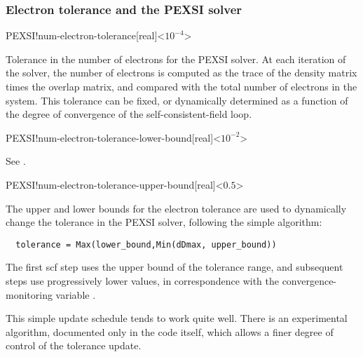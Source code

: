 \subsubsection{Electron tolerance and the PEXSI solver}


\begin{fdfentry}{PEXSI!num-electron-tolerance}[real]<$10^{-4}$>

  Tolerance in the number of electrons for the PEXSI solver. At each
  iteration of the solver, the number of electrons is computed as the
  trace of the density matrix times the overlap matrix, and compared
  with the total number of electrons in the system. This tolerance can
  be fixed, or dynamically determined as a function of the degree of
  convergence of the self-consistent-field loop.
  
\end{fdfentry}

\begin{fdfentry}{PEXSI!num-electron-tolerance-lower-bound}[real]<$10^{-2}$>

  See .

\end{fdfentry}

\begin{fdfentry}{PEXSI!num-electron-tolerance-upper-bound}[real]<$0.5$>

  The upper and lower bounds for the electron tolerance are used to
  dynamically change the tolerance in the PEXSI solver, following the
  simple algorithm:
\begin{verbatim}
  tolerance = Max(lower_bound,Min(dDmax, upper_bound))
\end{verbatim}
  The first scf step uses the upper bound of the tolerance range, and
  subsequent steps use progressively lower values, in correspondence
  with the convergence-monitoring variable .
  
  \note This simple update schedule tends to work quite well. There is
  an experimental algorithm, documented only in the code itself, which
  allows a finer degree of control of the tolerance update.

\end{fdfentry}


